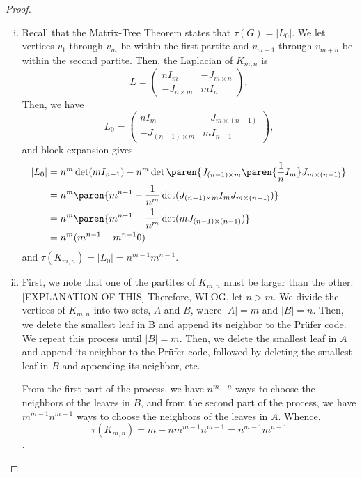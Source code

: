 \documentclass[11pt]{article}
\begin{document}
\begin{proof}
    \begin{enumerate}[(i)]
        \item Recall that the Matrix-Tree Theorem states that $\tau(G) = |L_0|$. We let vertices $v_1$ through $v_m$ be within the first partite and $v_{m+1}$ through $v_{m+n}$ be within the second partite. Then, the Laplacian of $K_{m,n}$ is \[L=\begin{pmatrix}nI_m&-J_{m \times n}\\-J_{n \times m}&mI_n\end{pmatrix},\] Then, we have
        \[
            L_0=\begin{pmatrix}nI_m&-J_{m \times (n-1)}\\-J_{(n-1) \times m}&mI_{n-1}\end{pmatrix},
        \]
        and block expansion gives 
        \begin{align*}
            |L_0|&=n^m\det(mI_{n-1})-n^m\det\paren{J_{(n-1)\times m}\paren{\frac{1}{n}I_m}J_{m\times(n-1)}}\\
            &=n^m\paren{m^{n-1}-\frac{1}{n^m}\det(J_{(n-1)\times m}I_mJ_{m\times (n-1)})}\\
            &=n^m\paren{m^{n-1}-\frac{1}{n^m}\det(mJ_{(n-1)\times(n-1)})}\\
            &=n^m(m^{n-1}-m^{n-1}0)
        \end{align*}
        and $\tau(K_{m,n})=|L_0|=n^{m-1}m^{n-1}$.

        \item First, we note that one of the partites of $K_{m,n}$ must be larger than the other. [EXPLANATION OF THIS] Therefore, WLOG, let $n > m$. We divide the vertices of $K_{m,n}$ into two sets, $A$ and $B$, where $|A|=m$ and $|B|=n$. Then, we delete the smallest leaf in B and append its neighbor to the Prüfer code. We repeat this process until $|B|=m$. Then, we delete the smallest leaf in $A$ and append its neighbor to the Prüfer code, followed by deleting the smallest leaf in $B$ and appending its neighbor, etc.
        
        From the first part of the process, we have $n^{m-n}$ ways to choose the neighbors of the leaves in $B$, and from the second part of the process, we have $m^{m-1} n^{m-1}$ ways to choose the neighbors of the leaves in $A$. Whence,
        \[
            \tau(K_{m,n})={m-n}m^{m-1} n^{m-1}=n^{m-1}m^{n-1}
        \].
    \end{enumerate}
\end{proof}
\setcounter{problem}{3}
\end{document}
